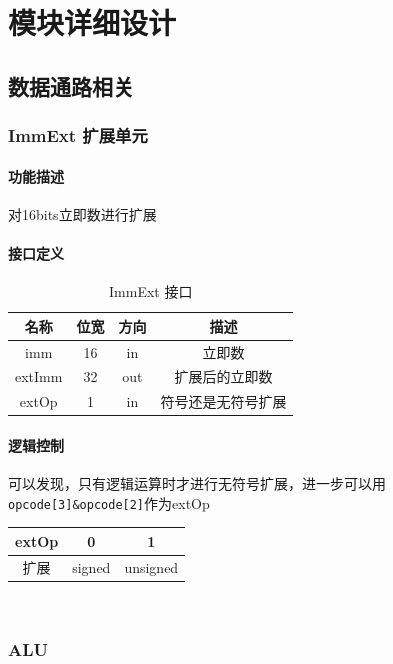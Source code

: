 \documentclass[UTF8]{ctexart}
\begin{document}
\section{模块详细设计}
\subsection{数据通路相关}
\subsubsection{ImmExt 扩展单元} 
\paragraph{功能描述} 
对16bits立即数进行扩展
\paragraph{接口定义}
\begin{table}[h]
    \centering
    \begin{tabular}{|c|c|c|c|}
        \hline  
        名称 & 位宽 & 方向 & 描述 \\ \hline 
        imm  & 16 & in & 立即数\\ \hline 
        extImm & 32 & out & 扩展后的立即数 \\ \hline
        extOp & 1 & in & 符号还是无符号扩展\\ \hline
    \end{tabular}
    \caption{ImmExt 接口}
\end{table}

\paragraph{逻辑控制}
可以发现，只有逻辑运算时才进行无符号扩展，进一步可以用\texttt{opcode[3]&opcode[2]}作为extOp
\begin{table}[h]
    \centering
    \begin{tabular}{|c|c|c|}
        \hline
        extOp & 0 & 1 \\ \hline
        扩展  & signed & unsigned \\ \hline
    \end{tabular}
\end{table} \\

\subsubsection{ALU}\label{sub:alu}
\end{document}
